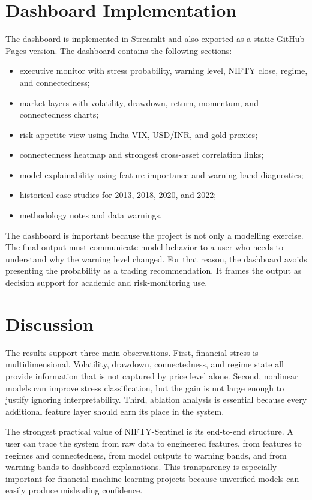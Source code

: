 \documentclass[12pt,a4paper]{article}
\begin{document}
\section{Dashboard Implementation}

The dashboard is implemented in Streamlit and also exported as a static GitHub Pages version. The dashboard contains the following sections:

\begin{itemize}
    \item executive monitor with stress probability, warning level, NIFTY close, regime, and connectedness;
    \item market layers with volatility, drawdown, return, momentum, and connectedness charts;
    \item risk appetite view using India VIX, USD/INR, and gold proxies;
    \item connectedness heatmap and strongest cross-asset correlation links;
    \item model explainability using feature-importance and warning-band diagnostics;
    \item historical case studies for 2013, 2018, 2020, and 2022;
    \item methodology notes and data warnings.
\end{itemize}

The dashboard is important because the project is not only a modelling exercise. The final output must communicate model behavior to a user who needs to understand why the warning level changed. For that reason, the dashboard avoids presenting the probability as a trading recommendation. It frames the output as decision support for academic and risk-monitoring use.

\section{Discussion}

The results support three main observations. First, financial stress is multidimensional. Volatility, drawdown, connectedness, and regime state all provide information that is not captured by price level alone. Second, nonlinear models can improve stress classification, but the gain is not large enough to justify ignoring interpretability. Third, ablation analysis is essential because every additional feature layer should earn its place in the system.

The strongest practical value of NIFTY-Sentinel is its end-to-end structure. A user can trace the system from raw data to engineered features, from features to regimes and connectedness, from model outputs to warning bands, and from warning bands to dashboard explanations. This transparency is especially important for financial machine learning projects because unverified models can easily produce misleading confidence.
\end{document}
